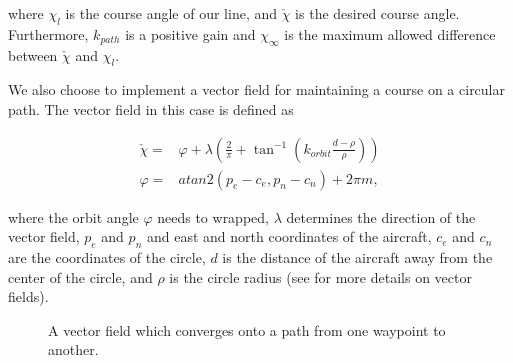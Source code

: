 \documentclass[letterpaper, 10 pt, conference]{ieeeconf}  %
\begin{document}
	where $\chi_l$ is the course angle of our line, and $\check{\chi}$ is the desired course angle. Furthermore, $k_{path}$ is a positive gain and $\chi_\infty$ is the maximum allowed difference between $\check{\chi}$ and $\chi_l$.
	
	We also choose to implement a vector field for maintaining a course on a circular path. The vector field in this case is defined as 
	
	
	\begin{equation}
	\begin{aligned}
	\check{\chi}= & \varphi +  \lambda \left(\frac{2}{\pi}+\tan^{-1}\left(k_{orbit}\frac{d-\rho}{\rho}\right)\right) \\
	\varphi = & atan2\left(p_e-c_e,p_n-c_n\right)+2\pi m,
	\end{aligned}
	\end{equation}
	
	where the orbit angle $\varphi$ needs to wrapped, $\lambda$ determines the direction of the vector field, $p_e$ and $p_n$ and east and north coordinates of the aircraft, $c_e$ and $c_n$ are the coordinates of the circle, $d$ is the distance of the aircraft away from the center of the circle, and $\rho$ is the circle radius (see \cite{beard2012small} for more details on vector fields).
	
	
	\begin{figure}
		\centering
		\caption{A vector field which converges onto a path from one waypoint to another.}
		\label{fig:vet_field}
		
	\end{figure}
	
\end{document}
